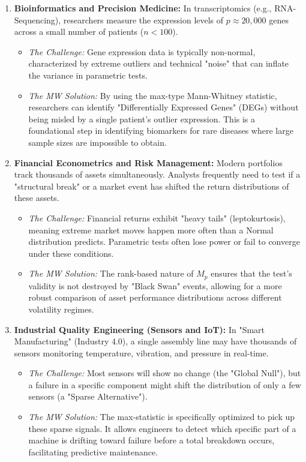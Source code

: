 \documentclass[10pt]{article}
\begin{document}
\begin{enumerate}
    \item \textbf{Bioinformatics and Precision Medicine:}
    In transcriptomics (e.g., RNA-Sequencing), researchers measure the expression levels of $p \approx 20,000$ genes across a small number of patients ($n < 100$). 
    \begin{itemize}
        \item \textit{The Challenge:} Gene expression data is typically non-normal, characterized by extreme outliers and technical "noise" that can inflate the variance in parametric tests.
        \item \textit{The MW Solution:} By using the max-type Mann-Whitney statistic, researchers can identify "Differentially Expressed Genes" (DEGs) without being misled by a single patient's outlier expression. This is a foundational step in identifying biomarkers for rare diseases where large sample sizes are impossible to obtain.
    \end{itemize}

    \item \textbf{Financial Econometrics and Risk Management:}
    Modern portfolios track thousands of assets simultaneously. Analysts frequently need to test if a "structural break" or a market event has shifted the return distributions of these assets.
    \begin{itemize}
        \item \textit{The Challenge:} Financial returns exhibit "heavy tails" (leptokurtosis), meaning extreme market moves happen more often than a Normal distribution predicts. Parametric tests often lose power or fail to converge under these conditions.
        \item \textit{The MW Solution:} The rank-based nature of $M_p$ ensures that the test's validity is not destroyed by "Black Swan" events, allowing for a more robust comparison of asset performance distributions across different volatility regimes.
    \end{itemize}

    \item \textbf{Industrial Quality Engineering (Sensors and IoT):}
    In "Smart Manufacturing" (Industry 4.0), a single assembly line may have thousands of sensors monitoring temperature, vibration, and pressure in real-time.
    \begin{itemize}
        \item \textit{The Challenge:} Most sensors will show no change (the "Global Null"), but a failure in a specific component might shift the distribution of only a few sensors (a "Sparse Alternative").
        \item \textit{The MW Solution:} The max-statistic is specifically optimized to pick up these sparse signals. It allows engineers to detect which specific part of a machine is drifting toward failure before a total breakdown occurs, facilitating predictive maintenance.
    \end{itemize}


\end{enumerate}
\end{document}
